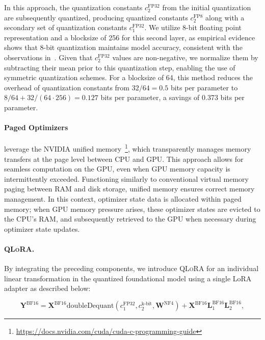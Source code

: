 In this approach, the quantization constants $c_2^{\text{FP32}}$ from the initial quantization are subsequently quantized, producing quantized constants $c_2^{\text{FP8}}$ along with a secondary set of quantization constants $c_1^{\text{FP32}}$. We utilize 8-bit floating point representation and a blocksize of 256 for this second layer, as empirical evidence shows that 8-bit quantization maintains model accuracy, consistent with the observations in~\citet{dettmers2022case}. Given that $c_2^{\text{FP32}}$ values are non-negative, we normalize them by subtracting their mean prior to this quantization step, enabling the use of symmetric quantization schemes. For a blocksize of 64, this method reduces the overhead of quantization constants from $32/64=0.5$ bits per parameter to $8/64 + 32/(64\cdot256) = 0.127$ bits per parameter, a savings of 0.373 bits per parameter.

\paragraph{Paged Optimizers} leverage the NVIDIA unified memory~\footnote{\tiny \url{https://docs.nvidia.com/cuda/cuda-c-programming-guide}}, which transparently manages memory transfers at the page level between CPU and GPU. This approach allows for seamless computation on the GPU, even when GPU memory capacity is intermittently exceeded. Functioning similarly to conventional virtual memory paging between RAM and disk storage, unified memory ensures correct memory management. In this context, optimizer state data is allocated within paged memory; when GPU memory pressure arises, these optimizer states are evicted to the CPU's RAM, and subsequently retrieved to the GPU when necessary during optimizer state updates.

\paragraph{\textsc{QLoRA}.} By integrating the preceding components, we introduce \textsc{QLoRA} for an individual linear transformation in the quantized foundational model using a single LoRA adapter as described below:

\begin{equation}
    \mathbf{Y}^{\text{BF16}} =  \mathbf{X}^{\text{BF16}} \text{doubleDequant}(c_1^{\text{FP32}}, c_2^{\text{k-bit}}, \mathbf{W}^{\text{NF4}}) + \mathbf{X}^{\text{BF16}}\mathbf{L}^{\text{BF16}}_1\mathbf{L}^{\text{BF16}}_2,
\end{equation}

